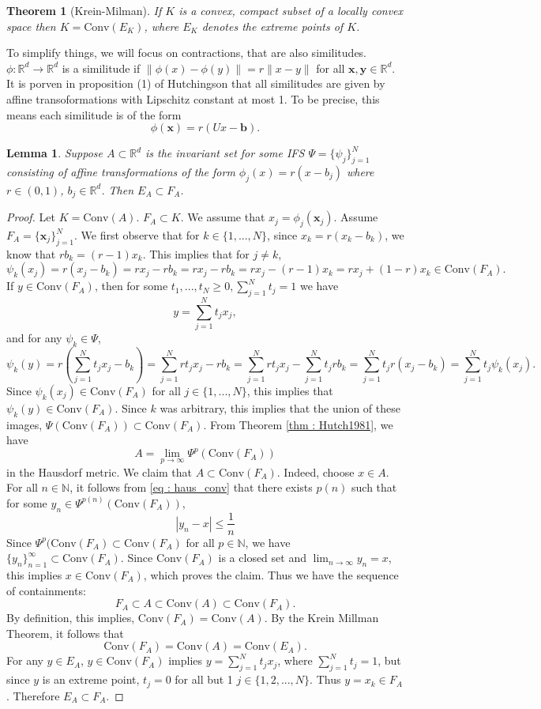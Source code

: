 \documentclass [52pt] {article}
\newcommand{\R}{\mathbb{R}}
\newcommand{\N}{\mathbb{N}}
\newcommand{\conv}{\text{Conv}}
\newtheorem{theorem}{Theorem}
\newtheorem{lemma}{Lemma}
\begin{document}
\begin{theorem}[Krein-Milman]
If $K$ is a convex, compact subset of a locally convex space then $K = \conv(E_K)$, where $E_K$ denotes the extreme points of $K$.
\end{theorem}

To simplify things, we will focus on contractions, that are also similitudes. $\phi:\R^d\to\R^d$ is a similitude if $\|\phi(x) -\phi(y)\| = r\|x-y\|$ for all $\mathbf{x}, \mathbf{y}\in\R^d$.  It is porven in proposition (1) of Hutchingson that all similitudes are given by affine transoformations with Lipschitz constant at most 1.  To be precise, this means each similitude is of the form
\[\phi(\mathbf{x}) = r(Ux - \mathbf{b}).\]


\begin{lemma}
Suppose $A\subset \R^d$ is the invariant set for some IFS $\Psi = \{\psi_j\}_{j=1}^N$ consisting of affine transformations of the form $\phi_j(x) = r(x-b_j)$ where $r\in(0,1)$, $b_j\in\R^d$.  Then $E_A \subset F_A$.  
\end{lemma}

\begin{proof}
Let $K = \conv(A)$.  $F_A\subset K$.  We assume that $x_j = \phi_j(\mathbf{x}_j)$.  Assume $F_A = \{\mathbf{x}_j\}_{j=1}^N$.  We first observe that for $k\in \{1,...,N\}$, since $x_k = r(x_k-b_k)$, we know that $rb_k = (r-1)x_k.$  This implies that for $j\not=k$, 
\[\psi_k(x_j) = r(x_j-b_k) = rx_j-rb_k =rx_j-rb_k = rx_j-(r-1)x_k = rx_j+(1-r)x_k\in\conv(F_A).\] 
If $y\in\conv(F_A)$, then for some $t_1,...,t_N\ge 0, \sum_{j=1}^N t_j = 1$ we have
\[y = \sum_{j=1}^Nt_j x_j,\]
and for any $\psi_k\in\Psi$,
\[\psi_k(y) = r\left(\sum_{j=1}^N t_jx_j - b_k\right) = \sum_{j=1}^N rt_jx_j -rb_k = \sum_{j=1}^N rt_jx_j-\sum_{j=1}^Nt_j rb_k = \sum_{j=1}^N t_j r(x_j-b_k) = \sum_{j=1}^N t_j\psi_k(x_j).\]
Since $\psi_k(x_j)\in \conv(F_A)$ for all $j\in \{1,...,N\}$, this implies that $\psi_k(y) \in \conv(F_A)$.  Since $k$ was arbitrary, this implies that the union of these images, $\Psi(\conv(F_A))\subset\conv(F_A)$.  From Theorem \ref{thm : Hutch1981}, we have 
\begin{equation}\label{eq : haus_conv}
A = \lim_{p\to\infty}\Psi^p(\conv(F_A))
\end{equation}
 in the Hausdorf metric.  We claim that $A\subset\conv(F_A)$.  Indeed, choose $x\in A$.  For all $n\in \N$, it follows from \ref{eq : haus_conv} that there exists $p(n)$ such that for some $y_n\in \Psi^{p(n)}(\conv(F_A))$,
 \[|y_n-x|\le \frac{1}{n}\]
Since $\Psi^p(\conv(F_A)\subset \conv(F_A)$ for all $p\in \N$, we have $\{y_n\}_{n=1}^\infty\subset\conv(F_A)$.  Since $\conv(F_A)$ is a closed set and $\lim_{n\to\infty}y_n = x$, this implies $x\in\conv(F_A)$, which proves the claim.   Thus we have the sequence of containments:
\[F_A\subset A\subset\conv(A)\subset\conv(F_A).\]
By definition, this implies, $\conv(F_A) = \conv(A)$.  By the Krein Millman Theorem, it follows that
\[\conv(F_A) = \conv(A) = \conv(E_A).\]
For any $y\in E_A$, $y\in\conv(F_A)$ implies $y =\sum_{j=1}^N t_jx_j$, where $\sum_{j=1}^N t_j = 1$, but since $y$ is an extreme point, $t_j = 0$ for all but 1 $j\in\{1,2,...,N\}$.  Thus $y = x_k\in F_A$.  Therefore $E_A\subset F_A$.
\end{proof}
\end{document}
